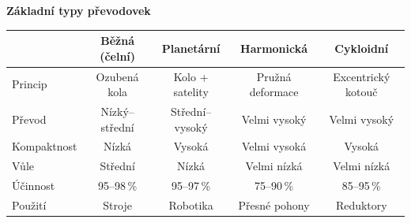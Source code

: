 \documentclass[a4paper,10pt]{article}
\begin{document}
\begin{vysvetlenibox}
\textbf{Základní typy převodovek}
\begin{center}
\begin{tabular}{|l|c|c|c|c|}
\hline
 & Běžná (čelní) & Planetární & Harmonická & Cykloidní \\
\hline
Princip & Ozubená kola & Kolo + satelity & Pružná deformace & Excentrický kotouč \\
\hline
Převod & Nízký--střední & Střední--vysoký & Velmi vysoký & Velmi vysoký \\
\hline
Kompaktnost & Nízká & Vysoká & Velmi vysoká & Vysoká \\
\hline
Vůle & Střední & Nízká & Velmi nízká & Velmi nízká \\
\hline
Účinnost & 95--98\,\% & 95--97\,\% & 75--90\,\% & 85--95\,\% \\
\hline
Použití & Stroje & Robotika & Přesné pohony & Reduktory \\
\hline
\end{tabular}
\end{center}

\end{vysvetlenibox}


\end{document}
